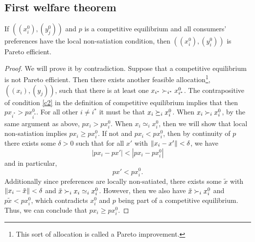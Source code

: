 \subsection{First welfare theorem}
\begin{theorem}
  If $((x_i^0),(y^0_j))$ and $p$ is a competitive equilibrium and all
  consumers' preferences have the local non-satiation condition, then
  $((x^0_i),(y^0_i))$ is Pareto efficient.
\end{theorem}
\begin{proof}
  We will prove it by contradiction. Suppose that a competitive
  equilibrium is not Pareto efficient. Then there exists another
  feasible allocation\footnote{This sort of allocation is called a
    Pareto improvement.}, $((x_i),(y_j))$, such that there is at least
  one $x_{i^*} \succ_{i^*} x_{i^*}^0$. The contrapositive of condition
  \ref{c2} in the definition of competitive equilibrium implies that
  then $p x_{i^*} > p x_{i^*}^0$.  For all other $i \neq i^*$ it must
  be that $x_i \succeq_i x_i^0$. When $x_i \succ_i x_i^0$, by the same
  argument as above, $p x_i > p x_i^0$. When $x_i \simeq_i x_i^0$,
  then we will show that local non-satiation implies
  $px_i \geq px_i^0$. If not and $px_i < p x_i^0$, then by continuity
  of $p$ there exists some $\delta > 0$ such that for all $x'$ with
  $\left\Vert {x_i - x'} \right\Vert < \delta$, we have
  \[ | p x_i - p x' | < | px_i - p x_i^0| \]
  and in particular, 
  \[ p x' < px_i^0. \]
  Additionally since preferences are locally non-satiated, there
  exists some $\tilde{x}$ with $\left\Vert {x_i - \tilde{x}} \right\Vert<\delta$ and
  $\tilde{x} \succ_i x_i \simeq_i x_i^0$. However, then we also have
  $\tilde{x} \succ_i x_i^0$ and $p \tilde{x} < p x_i^0$, which contradicts
  $x_i^0$  and $p$ being part of a competitive equilibrium. Thus, we
  can conclude that $p x_i \geq p x_i^0$.


\end{proof}
